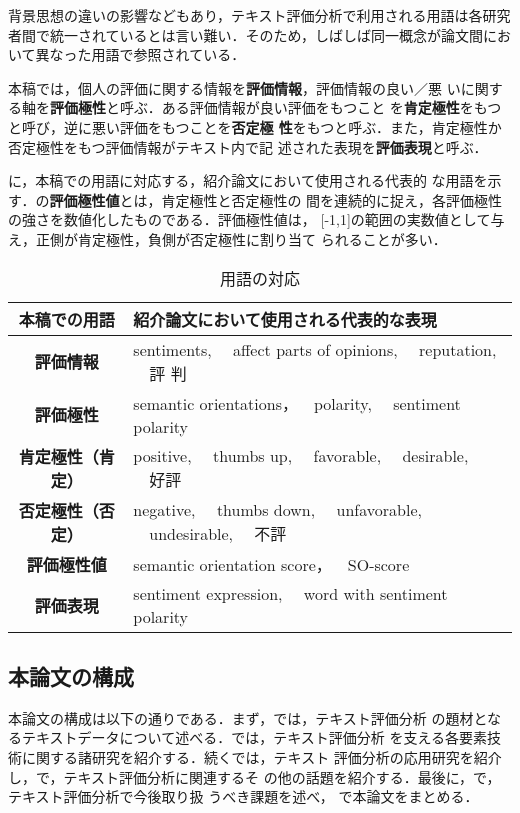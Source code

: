 背景思想の違いの影響などもあり，テキスト評価分析で利用される用語は各研究
者間で統一されているとは言い難い．そのため，しばしば同一概念が論文間にお
いて異なった用語で参照されている．

本稿では，個人の評価に関する情報を\textbf{評価情報}，評価情報の良い／悪
いに関する軸を\textbf{評価極性}と呼ぶ．ある評価情報が良い評価をもつこと
を\textbf{肯定極性}をもつと呼び，逆に悪い評価をもつことを\textbf{否定極
性}をもつと呼ぶ．また，肯定極性か否定極性をもつ評価情報がテキスト内で記
述された表現を\textbf{評価表現}と呼ぶ．

に，本稿での用語に対応する，紹介論文において使用される代表的
な用語を示す．の\textbf{評価極性値}とは，肯定極性と否定極性の
間を連続的に捉え，各評価極性の強さを数値化したものである．評価極性値は，
[-1,1]の範囲の実数値として与え，正側が肯定極性，負側が否定極性に割り当て
られることが多い．

\begin{table}[b]
 \begin{center}
 \caption{用語の対応} 
 \label{tab:yougo}
 \begin{tabular}{c|l}
 \hline \hline
本稿での用語 & 紹介論文において使用される代表的な表現
  \\ \hline
{\bf 評価情報} & sentiments, ~~affect parts of opinions, ~~reputation, ~~評
  判 \\
{\bf 評価極性} & semantic orientations，~~polarity, ~~sentiment
  polarity  \\
{\bf 肯定極性（肯定）} & positive, ~~thumbs up, ~~favorable, ~~desirable, ~~好評 \\
{\bf 否定極性（否定）} & negative, ~~thumbs down, ~~unfavorable, ~~undesirable, ~~不評
  \\
{\bf 評価極性値}   & semantic orientation score，~~SO-score \\
{\bf 評価表現}   & sentiment expression, ~~word with sentiment polarity 
\\ \hline
 \end{tabular}
 \end{center}
\end{table}


\subsection{本論文の構成}

本論文の構成は以下の通りである．まず，では，テキスト評価分析
の題材となるテキストデータについて述べる．では，テキスト評価分析
を支える各要素技術に関する諸研究を紹介する．続くでは，テキスト
評価分析の応用研究を紹介し，で，テキスト評価分析に関連するそ
の他の話題を紹介する．最後に，で，テキスト評価分析で今後取り扱
うべき課題を述べ， で本論文をまとめる．

